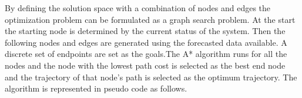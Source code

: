 By defining the solution space with a combination of nodes and edges the optimization problem can be formulated as a graph search problem. At the start the starting node is determined by the current status of the system. Then the following nodes and edges are generated using the forecasted data available. A discrete set of endpoints are set as the goals.The A*  algorithm runs for all the nodes and the node with the lowest path cost is selected as the best end node and the trajectory of that node's path is selected as the optimum trajectory. The algorithm is represented in pseudo code as follows. \\


